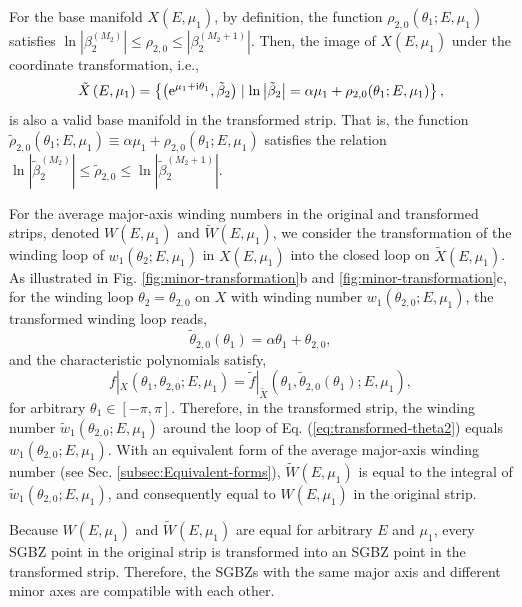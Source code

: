For the base manifold $X(E,\mu_{1})$, by definition, the function
$\rho_{2,0}(\theta_{1};E,\mu_{1})$  satisfies $\ln\left|\beta_{2}^{(M_{2})}\right|\leq \rho_{2,0}\leq\left|\beta_{2}^{(M_{2}+1)}\right|$.
Then, the image of $X(E,\mu_{1})$ under the coordinate transformation,
i.e., 
\begin{equation}
\tilde{X}\left(E,\mu_{1}\right)=\left\{ \left(\mathrm{e}^{\mu_{1}+\mathrm{i}\theta_{1}},\tilde{\beta}_{2}\right)\mid\ln\left|\tilde{\beta}_{2}\right|=\alpha\mu_{1}+\rho_{2,0}(\theta_{1};E,\mu_{1})\right\} ,
\end{equation}
is also a valid base manifold in the transformed strip. That is, the
function $\tilde{\rho}_{2,0}\left(\theta_{1};E,\mu_{1}\right)\equiv\alpha\mu_{1}+\rho_{2,0}(\theta_{1};E,\mu_{1})$
satisfies the relation $\ln|\tilde{\beta}_{2}^{(M_{2})}|\leq\tilde{\rho}_{2,0}\leq\ln|\tilde{\beta}_{2}^{(M_{2}+1)}|$.

For the average major-axis winding numbers in the original and transformed strips,
denoted $W(E,\mu_1)$ and $\tilde{W}(E,\mu_1)$, we consider the transformation
of the winding loop of $w_{1}(\theta_{2};E,\mu_{1})$ in $X(E,\mu_{1})$
into the closed loop on $\tilde{X}(E,\mu_{1})$. As illustrated in
Fig. \ref{fig:minor-transformation}b and \ref{fig:minor-transformation}c,
for the winding loop $\theta_{2}=\theta_{2,0}$ on $X$ with winding
number $w_{1}(\theta_{2,0};E,\mu_{1})$, the transformed winding loop
reads, 
\begin{equation}
\tilde{\theta}_{2,0}\left(\theta_{1}\right)=\alpha\theta_{1}+\theta_{2,0},\label{eq:transformed-theta2}
\end{equation}
and the characteristic polynomials satisfy, 
\begin{equation}
f|_{X}\left(\theta_{1},\theta_{2,0};E,\mu_{1}\right)=\tilde{f}|_{\tilde{X}}\left(\theta_{1},\tilde{\theta}_{2,0}\left(\theta_{1}\right);E,\mu_{1}\right),\label{eq:relation-ChP}
\end{equation}
for arbitrary $\theta_{1}\in\left[-\pi,\pi\right]$. Therefore, in
the transformed strip, the winding number $\tilde{w}_{1}(\theta_{2,0};E,\mu_{1})$
around the loop of Eq. (\ref{eq:transformed-theta2}) equals $w_{1}(\theta_{2,0};E,\mu_{1})$.
With an equivalent form of the average major-axis winding number (see Sec. \ref{subsec:Equivalent-forms}),
$\tilde{W}(E,\mu_{1})$ is equal to the integral of $\tilde{w}_{1}(\theta_{2,0};E,\mu_{1})$,
and consequently equal to $W(E,\mu_{1})$ in the original strip.

Because $W(E,\mu_{1})$ and $\tilde{W}(E,\mu_{1})$
are equal for arbitrary $E$ and $\mu_{1}$, every SGBZ point in the
original strip is transformed into an SGBZ point in the transformed
strip. Therefore, the SGBZs with the same major axis and different
minor axes are compatible with each other.

